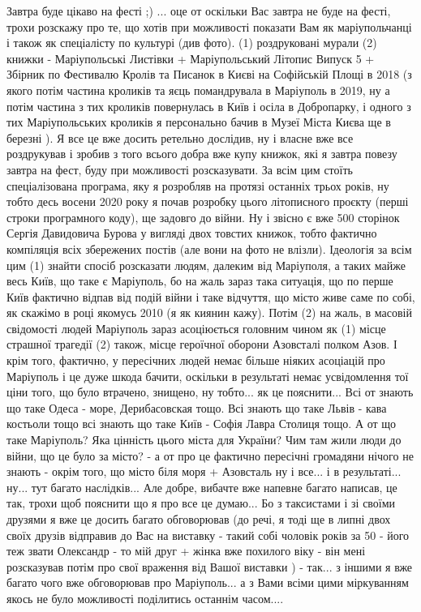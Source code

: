 Завтра буде цікаво на фесті ;) ...  оце от оскільки Вас завтра не буде на
фесті, трохи розскажу про те, що хотів при можливості показати Вам як
маріупольчанці і також як спеціалісту по культурі (див фото). (1) роздруковані
мурали (2) книжки - Маріупольські Листівки + Маріупольський Літопис Випуск 5 +
Збірник по Фестивалю Кролів та Писанок в Києві на Софійській Площі в 2018 (з
якого потім частина кроликів та яєць помандрувала в Маріуполь в 2019, ну а
потім частина з тих кроликів повернулась в Київ і осіла в Добропарку, і одного
з тих Маріупольських кроликів я персонально бачив в Музеї Міста Києва ще в
березні ).  Я все це вже досить ретельно дослідив, ну і власне вже все
роздрукував і зробив з того всього добра вже купу книжок, які я завтра повезу
завтра на фест, буду при можливості розсказувати. За всім цим стоїть
спеціалізована програма, яку я розробляв на протязі останніх трьох років, ну
тобто десь восени 2020 року я почав розробку цього літописного проєкту (перші строки програмного коду), ще
задовго до війни. Ну і звісно є вже 500 сторінок Сергія Давидовича Бурова у
вигляді двох товстих книжок, тобто фактично компіляція всіх збережених постів
(але вони на фото не влізли). Ідеологія за всім цим (1) знайти спосіб
розсказати людям, далеким від Маріуполя, а таких майже весь Київ, що таке є
Маріуполь, бо на жаль зараз така ситуація, що по перше Київ фактично відпав від
подій війни і таке відчуття, що місто живе саме по собі, як скажімо в році
якомусь 2010 (я як киянин кажу).  Потім (2) на жаль, в масовій свідомості людей
Маріуполь зараз асоціюється головним чином як (1) місце страшної трагедії (2)
також, місце героїчної оборони Азовсталі полком Азов.  І крім того, фактично, у
пересічних людей немає більше ніяких асоціацій про Маріуполь і це дуже шкода
бачити, оскільки в результаті немає усвідомлення тої ціни того, що було
втрачено, знищено, ну тобто...  як це пояснити... Всі от знають що таке Одеса -
море, Дерибасовская тощо. Всі знають що таке Львів - кава костьоли тощо всі
знають що таке Київ - Софія Лавра Столиця тощо. А от що таке Маріуполь? Яка
цінність цього міста для України? Чим там жили люди до війни, що це було за
місто? - а от про це фактично пересічні громадяни нічого не знають - окрім
того, що місто біля моря + Азовсталь ну і все...  і в результаті... ну... тут
багато наслідків... Але добре, вибачте вже напевне багато написав, це так,
трохи щоб пояснити що я про все це думаю... Бо з таксистами і зі своїми друзями
я вже це досить багато обговорював (до речі, я тоді ще в липні двох своїх
друзів відправив до Вас на виставку - такий собі чоловік років за 50 - його теж
звати Олександр - то мій друг + жінка вже похилого віку - він мені розсказував
потім про свої враження від Вашої виставки ) - так... з іншими я вже багато
чого вже обговорював про Маріуполь...  а з Вами всіми цими міркуванням якось не
було можливості поділитись останнім часом....

